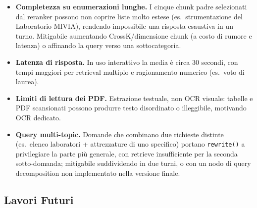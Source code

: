 \documentclass[11pt,a4paper]{article}
\newcommand{\code}[1]{\texttt{\small#1}}
\begin{document}
\begin{itemize}
    corso di Ingegneria del Software'' che atterra su piano di studi invece che scheda
    insegnamento) il modello può essere troppo ottimistico. Servirebbero segnali
    strutturati più forti (context header più discriminanti) o un judge di pertinenza
    separato.
  \item \textbf{Completezza su enumerazioni lunghe.} I cinque chunk padre selezionati dal
    reranker possono non coprire liste molto estese (es.\ strumentazione del Laboratorio
    MIVIA), rendendo impossibile una risposta esaustiva in un turno. Mitigabile
    aumentando CrossK/dimensione chunk (a costo di rumore e latenza) o affinando la
    query verso una sottocategoria.
  \item \textbf{Latenza di risposta.} In uso interattivo la media è circa 30 secondi, con
    tempi maggiori per retrieval multiplo e ragionamento numerico (es.\ voto di laurea).
  \item \textbf{Limiti di lettura dei PDF.} Estrazione testuale, non OCR visuale: tabelle
    e PDF scansionati possono produrre testo disordinato o illeggibile, motivando OCR
    dedicato.
  \item \textbf{Query multi-topic.} Domande che combinano due richieste distinte (es.\
    elenco laboratori + attrezzature di uno specifico) portano \code{rewrite()} a
    privilegiare la parte più generale, con retrieve insufficiente per la seconda
    sotto-domanda; mitigabile suddividendo in due turni, o con un nodo di query
    decomposition non implementato nella versione finale.
\end{itemize}

\subsection{Lavori Futuri}
\end{document}
